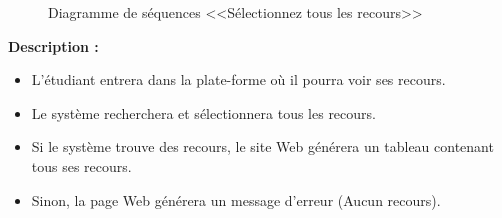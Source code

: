 \documentclass[12pt]{report}
\begin{document}
\newpage

\begin{figure}[h]
\centering
    \centerline{}
    \caption{Diagramme de séquences <<Sélectionnez tous les recours>>}
\end{figure}

\vspace{0.3in}

\textbf{Description :}

\begin{itemize}
    \item L'étudiant entrera dans la plate-forme où il pourra voir ses recours.
    \item Le système recherchera et sélectionnera tous les recours. 
    \item Si le système trouve des recours, le site Web générera un tableau contenant tous ses recours.
    \item Sinon, la page Web générera un message d'erreur (Aucun recours).
\end{itemize}

\newpage
\end{document}
